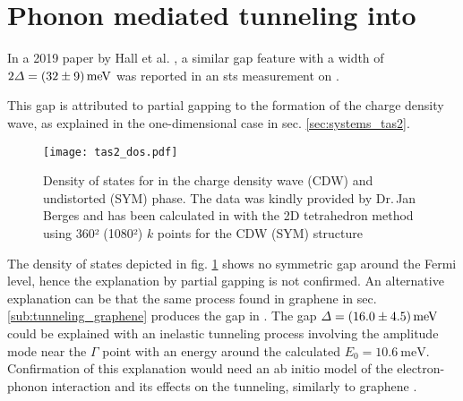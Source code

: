 \documentclass[main.tex]{subfiles}
\begin{document}
\section{Phonon mediated tunneling into \TaS}

In a 2019 paper by Hall et al. \cite{hall_environmental_2019}, a similar gap feature with a width of \(2 \Delta = \SI[separate-uncertainty = true]{32 \pm 9}{\milli\eV}\) was reported in an \acrshort{sts} measurement on \TaS.

This gap is attributed to partial gapping to the formation of the charge density wave, as explained in the one-dimensional case in sec. \ref{sec:systems_tas2}.

\begin{figure}
    \centering
    \texttt{[image: tas2\_dos.pdf]}
    \caption{Density of states for \TaS in the charge density wave (CDW) and undistorted (SYM) phase. The data was kindly provided by Dr.\,Jan Berges and has been calculated in \QE with the 2D tetrahedron method using 360² (1080²) \(k\) points for the CDW (SYM) structure}
    \label{fig:tas2_dos}
\end{figure}
The density of states depicted in fig. \ref{fig:tas2_dos} shows no symmetric gap around the Fermi level, hence the explanation by partial gapping is not confirmed.
An alternative explanation can be that the same process found in graphene in sec. \ref{sub:tunneling_graphene} produces the gap in \TaS.
The gap \(\Delta = \SI[separate-uncertainty = true]{16 \pm 4.5}{\milli\eV}\) could be explained with an inelastic tunneling process involving the amplitude mode near the \(\Gamma\) point with an energy around the calculated \(E_0 = \SI{10.6}{\milli\eV}\).
Confirmation of this explanation would need an ab initio model of the electron-phonon interaction and its effects on the tunneling, similarly to graphene \cite{wehling_phonon-mediated_2008}.
\end{document}

